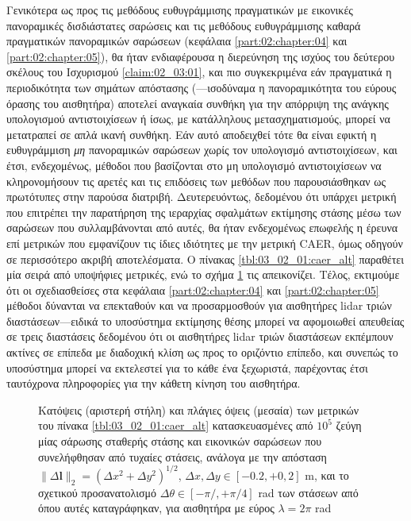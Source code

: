 Γενικότερα ως προς τις μεθόδους ευθυγράμμισης πραγματικών με εικονικές
πανοραμικές δισδιάστατες σαρώσεις και τις μεθόδους ευθυγράμμισης καθαρά
πραγματικών πανοραμικών σαρώσεων (κεφάλαια \ref{part:02:chapter:04} και
\ref{part:02:chapter:05}), θα ήταν ενδιαφέρουσα η διερεύνηση της ισχύος του
δεύτερου σκέλους του Ισχυρισμού \ref{claim:02_03:01}, και πιο συγκεκριμένα εάν
πραγματικά η περιοδικότητα των σημάτων απόστασης (---ισοδύναμα η πανοραμικότητα
του εύρους όρασης του αισθητήρα) αποτελεί αναγκαία συνθήκη για την απόρριψη της
ανάγκης υπολογισμού αντιστοιχίσεων ή ίσως, με κατάλληλους μετασχηματισμούς,
μπορεί να μετατραπεί σε απλά ικανή συνθήκη. Εάν αυτό αποδειχθεί τότε θα είναι
εφικτή η ευθυγράμμιση \textit{μη} πανοραμικών σαρώσεων χωρίς τον υπολογισμό
αντιστοιχίσεων, και έτσι, ενδεχομένως, μέθοδοι που βασίζονται στο μη υπολογισμό
αντιστοιχίσεων να κληρονομήσουν τις αρετές και τις επιδόσεις των μεθόδων που
παρουσιάσθηκαν ως πρωτότυπες στην παρούσα διατριβή. Δευτερευόντως, δεδομένου
ότι υπάρχει μετρική που επιτρέπει την παρατήρηση της ιεραρχίας σφαλμάτων
εκτίμησης στάσης μέσω των σαρώσεων που συλλαμβάνονται από αυτές, θα ήταν
ενδεχομένως επωφελής η έρευνα επί μετρικών που εμφανίζουν τις ίδιες ιδιότητες
με την μετρική CAER, όμως οδηγούν σε περισσότερο ακριβή αποτελέσματα. Ο πίνακας
\ref{tbl:03_02_01:caer_alt} παραθέτει μία σειρά από υποψήφιες μετρικές, ενώ το
σχήμα \ref{fig:03_02_01:caer_alt} τις απεικονίζει. Τέλος, εκτιμούμε ότι οι
σχεδιασθείσες στα κεφάλαια \ref{part:02:chapter:04} και \ref{part:02:chapter:05}
μέθοδοι δύνανται να επεκταθούν και να προσαρμοσθούν για αισθητήρες lidar τριών
διαστάσεων---ειδικά το υποσύστημα εκτίμησης θέσης μπορεί να αφομοιωθεί
απευθείας σε τρεις διαστάσεις δεδομένου ότι οι αισθητήρες lidar τριών διαστάσεων
εκπέμπουν ακτίνες σε επίπεδα με διαδοχική κλίση ως προς το οριζόντιο επίπεδο,
και συνεπώς το υποσύστημα μπορεί να εκτελεστεί για το κάθε ένα ξεχωριστά,
παρέχοντας έτσι ταυτόχρονα πληροφορίες για την κάθετη κίνηση του αισθητήρα.

\begin{figure}\centering
  
  \vspace{1cm}
  \caption{\small Κατόψεις (αριστερή στήλη) και πλάγιες όψεις (μεσαία) των
           μετρικών του πίνακα \ref{tbl:03_02_01:caer_alt} κατασκευασμένες από
           $10^5$ ζεύγη μίας σάρωσης σταθερής στάσης και εικονικών σαρώσεων που
           συνελήφθησαν από τυχαίες στάσεις, ανάλογα με την απόσταση $\|\Delta
           \bm{l}\|_2 = (\Delta x^2 + \Delta y^2)^{1/2}$, $\Delta x, \Delta y
           \in [-0.2, +0,2]$ m, και το σχετικού προσανατολισμό $\Delta \theta
           \in [-\pi/, +\pi/4]$ rad των στάσεων από όπου αυτές καταγράφηκαν,
           για αισθητήρα με εύρος $\lambda = 2\pi$ rad}
  \label{fig:03_02_01:caer_alt}
\end{figure}

